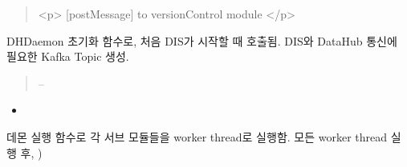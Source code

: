 \documentclass[a4paper,10pt,english]{sphinxmanual}
\begin{document}
\begin{fulllineitems}
\begin{fulllineitems}
\begin{quote}
\sphinxAtStartPar
<p> {[}postMessage{]} to versionControl module  </p>
\end{quote}

\end{fulllineitems}


\begin{fulllineitems}
\label{\detokenize{_DHDaemon:DHDaemon.init}}
\pysigstartsignatures
{}
\pysigstopsignatures
\sphinxAtStartPar
DHDaemon 초기화 함수로, 처음 DIS가 시작할 때 호출됨.
DIS와 DataHub 통신에 필요한 Kafka Topic 생성.
\begin{quote}\begin{description}
\sphinxAtStartPar
{} –

\end{description}\end{quote}


\nopagebreak

\begin{itemize}
\item {} 
\sphinxAtStartPar
{\hyperref[\detokenize{_ctrlKafka:ctrlProducer.createCtrlTopics}]{}}

\end{itemize}



\end{fulllineitems}


\begin{fulllineitems}
\label{\detokenize{_DHDaemon:DHDaemon.run}}
\pysigstartsignatures
{}
\pysigstopsignatures
\sphinxAtStartPar
데몬 실행 함수로 각 서브 모듈들을 worker thread로 실행함.
모든 worker thread 실행 후, )



\end{fulllineitems}
\end{fulllineitems}
\end{document}

